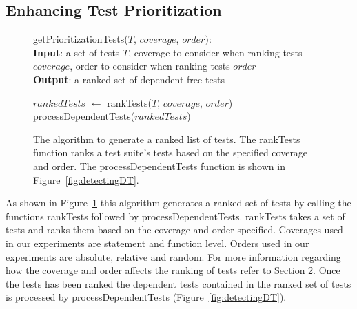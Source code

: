 \subsection{Enhancing Test Prioritization}
\begin{figure}[t]
	getPrioritizationTests($\mathit{T}$, $\mathit{coverage}$, $\mathit{order}):$\\
	\textbf{Input}: a set of tests $\mathit{T}$, coverage to consider when ranking tests $\mathit{coverage}$, order to consider when ranking tests $\mathit{order}$\\
	\textbf{Output}: a ranked set of dependent-free tests\\
	 \begin{algorithmic}[1]
	 	\vspace{-5mm}
		\STATE $\mathit{rankedTests}$ $\leftarrow$ rankTests($\mathit{T}$, $\mathit{coverage}$, $\mathit{order}$)
		\RETURN processDependentTests($\mathit{rankedTests}$)
	\end{algorithmic}
	\vspace{-3mm}
	\caption {
		The algorithm to generate a ranked list of tests. The rankTests function ranks a test suite's tests based on the specified coverage and order. The processDependentTests function is shown in Figure~\ref{fig:detectingDT}.
	}
	\label{fig:prioritization}
\end{figure}
As shown in Figure~\ref{fig:prioritization} this algorithm generates a ranked set of tests by calling the functions rankTests followed by processDependentTests. rankTests takes a set of tests and ranks them based on the coverage and order specified. Coverages used in our experiments are statement and function level. Orders used in our experiments are absolute, relative and random. For more information regarding how the coverage and order affects the ranking of tests refer to Section 2. Once the tests has been ranked the dependent tests contained in the ranked set of tests is processed by processDependentTests (Figure~\ref{fig:detectingDT}).

